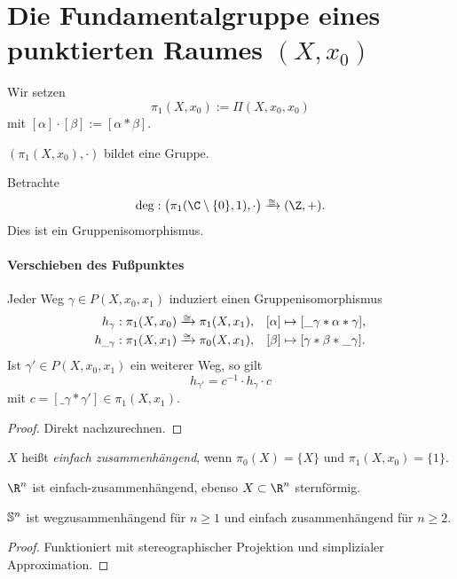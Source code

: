

\section{Die Fundamentalgruppe eines punktierten Raumes $(X,x_0)$}


\begin{df}
	Wir setzen
	\[
		\pi_1(X, x_0)
		:= \Pi(X, x_0, x_0)
	\]
	mit $[\alpha] \cdot [\beta] := [\alpha * \beta]$.

	$(\pi_1(X, x_0), \cdot)$ bildet eine Gruppe.
\end{df}

\begin{ex}
	Betrachte
	\[
		\deg: \big(\pi_1(\C \setminus \{0\}, 1), \cdot\big) \homeomorphicto (\Z, +).
	\]
	Dies ist ein Gruppenisomorphismus.
\end{ex}

\paragraph{Verschieben des Fußpunktes}

\begin{prop}
	Jeder Weg $\gamma \in P(X, x_0, x_1)$ induziert einen Gruppenisomorphismus
	\begin{align*}
		h_\gamma: \pi_1(X,x_0) &\isomorphicto \pi_1(X, x_1),& [\alpha] &\mapsto [\_\gamma * \alpha * \gamma], \\
		h_{\_\gamma}: \pi_1(X,x_1) &\isomorphicto \pi_0(X, x_1),& [\beta] &\mapsto [\gamma * \beta * \_\gamma].
	\end{align*}
	Ist $\gamma' \in P(X, x_0, x_1)$ ein weiterer Weg, so gilt
	\[
		h_{\gamma'} = c^{-1} \cdot h_\gamma \cdot c
	\]
	mit $c = [\_\gamma * \gamma'] \in \pi_1(X, x_1)$.
	\begin{proof}
		Direkt nachzurechnen.
	\end{proof}
\end{prop}

\begin{df}
	$X$ heißt \emph{einfach zusammenhängend}, wenn $\pi_0(X) = \{X\}$ und $\pi_1(X, x_0) = \{1\}$.
\end{df}

\begin{ex}
	$\R^n$ ist einfach-zusammenhängend, ebenso $X \subset \R^n$ sternförmig.
\end{ex}

\begin{ex}
	$\S^n$ ist wegzusammenhängend für $n \ge 1$ und einfach zusammenhängend für $n \ge 2$.
	\begin{proof}
		Funktioniert mit stereographischer Projektion und simplizialer Approximation.
	\end{proof}
\end{ex}

